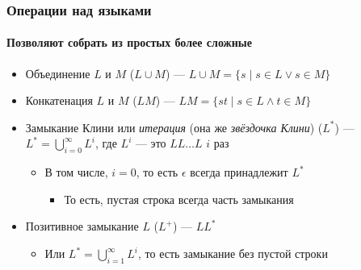 \documentclass[xetex,mathserif,serif]{beamer}
\begin{document}
    \begin{frame}
        \frametitle{Операции над языками}
        \framesubtitle{Позволяют собрать из простых более сложные}
        \begin{itemize}
            \item Объединение $L$ и $M$ ($L \cup M$) --- $L \cup M = \{s \mid s \in L \vee s \in M\}$
            \item Конкатенация $L$ и $M$ ($LM$) --- $LM = \{st \mid s \in L \wedge t \in M\}$
            \item Замыкание Клини или \textit{итерация} (она же \textit{звёздочка Клини}) ($L^*$) --- 
                $L^* = \bigcup\limits_{i=0}^{\infty}L^i$, где $L^i$ --- это $LL \ldots L$ $i$ раз
            \begin{itemize}
                \item В том числе, $i = 0$, то есть $\epsilon$ всегда принадлежит $L^*$
                \begin{itemize}
                    \item То есть, пустая строка всегда часть замыкания
                \end{itemize}
            \end{itemize}
            \item Позитивное замыкание $L$ ($L^+$) --- $LL^*$
            \begin{itemize}
                \item Или $L^* = \bigcup\limits_{i=1}^{\infty}L^i$, то есть замыкание без пустой строки
            \end{itemize}
        \end{itemize}
    \end{frame}
\end{document}
